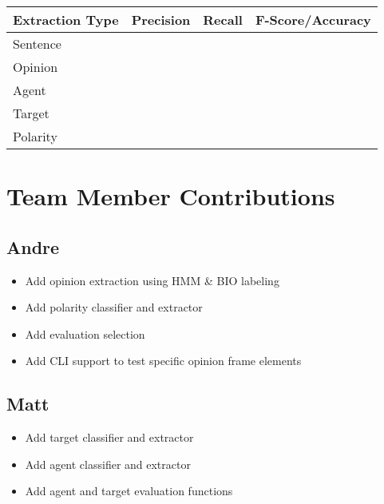 \documentclass{article}
\begin{document}
    \begin{center} %
        \begin{tabular}{ | l | c | r | c}
            \hline
            Extraction Type & Precision & Recall & F-Score/Accuracy \\ \hline
            Sentence &  &  & \\ \hline
            Opinion &  &  & \\ \hline
            Agent &  &  & \\ \hline
            Target &  &  & \\ \hline
            Polarity &  &  & \\ \hline
        \end{tabular}
    \end{center}

    \section{Team Member Contributions}

        \subsection{Andre}

            \begin{itemize}
                \item Add opinion extraction using HMM \& BIO labeling
                \item Add polarity classifier and extractor
                \item Add evaluation selection
                \item Add CLI support to test specific opinion frame elements
            \end{itemize}

        \subsection{Matt}

            \begin{itemize}
                \item Add target classifier and extractor
                \item Add agent classifier and extractor
                \item Add agent and target evaluation functions
            \end{itemize}
\end{document}
